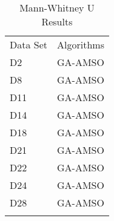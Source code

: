 \begin{table}
\caption{Mann-Whitney U Results}
\label{tbl:mann:whitney:u}
\begin{tabular}{ll}
\noalign{\smallskip}\hline\noalign{\smallskip}
Data Set & Algorithms \\
\noalign{\smallskip}\hline
D2&GA-AMSO\\
D8&GA-AMSO\\
D11&GA-AMSO\\
D14&GA-AMSO\\
D18&GA-AMSO\\
D21&GA-AMSO\\
D22&GA-AMSO\\
D24&GA-AMSO\\
D28&GA-AMSO\\
\noalign{\smallskip}\hline
\end{tabular}
\end{table}
